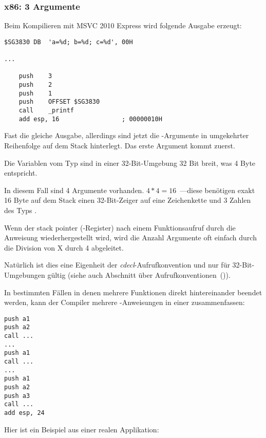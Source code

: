 \subsubsection{x86: 3 Argumente}


Beim Kompilieren mit MSVC 2010 Express wird folgende Ausgabe erzeugt:

\begin{lstlisting}[style=customasmx86]
$SG3830	DB	'a=%d; b=%d; c=%d', 00H

...

	push	3
	push	2
	push	1
	push	OFFSET $SG3830
	call	_printf
	add	esp, 16					; 00000010H
\end{lstlisting}

Fast die gleiche Ausgabe, allerdings sind jetzt die \printf-Argumente in umgekehrter Reihenfolge
auf dem Stack hinterlegt. Das erste Argument kommt zuerst.

Die Variablen vom Typ \Tint sind in einer 32-Bit-Umgebung 32 Bit breit, was 4 Byte entspricht.

In diesem Fall sind 4 Argumente vorhanden. $4*4 = 16$~---diese benötigen exakt 16 Byte auf dem Stack
einen 32-Bit-Zeiger auf eine Zeichenkette und 3 Zahlen des Typs \Tint.

Wenn der \gls{stack pointer} (\ESP-Register) nach einem Funktionsaufruf durch die Anweisung
 wiederhergestellt wird, wird die Anzahl Argumente oft einfach durch
die Division von X durch 4 abgeleitet.

Natürlich ist dies eine Eigenheit der \emph{cdecl}-Aufrufkonvention und nur für 32-Bit-Umgebungen gültig
(siehe auch Abschnitt über Aufrufkonventionen~()).

In bestimmten Fällen in denen mehrere Funktionen direkt hintereinander beendet werden, kann
der Compiler mehrere -Anweisungen in einer zusammenfassen:

\begin{lstlisting}[style=customasmx86]
push a1
push a2
call ...
...
push a1
call ...
...
push a1
push a2
push a3
call ...
add esp, 24
\end{lstlisting}

Hier ist ein Beispiel aus einer realen Applikation:


